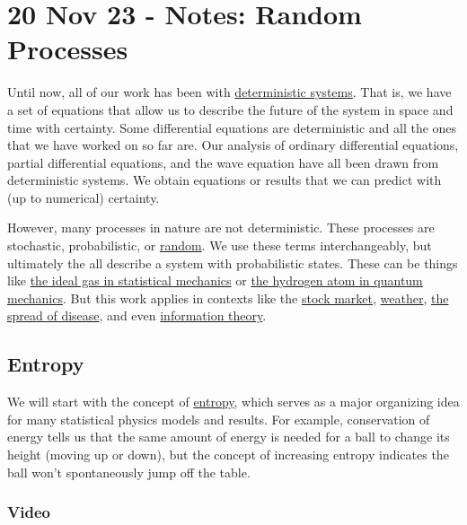 \section{20 Nov 23 - Notes: Random
Processes}\label{nov-23---notes-random-processes}

Until now, all of our work has been with
\href{https://en.wikipedia.org/wiki/Deterministic_system}{deterministic
systems}. That is, we have a set of equations that allow us to describe
the future of the system in space and time with certainty. Some
differential equations are deterministic and all the ones that we have
worked on so far are. Our analysis of ordinary differential equations,
partial differential equations, and the wave equation have all been
drawn from deterministic systems. We obtain equations or results that we
can predict with (up to numerical) certainty.

However, many processes in nature are not deterministic. These processes
are stochastic, probabilistic, or
\href{https://en.wikipedia.org/wiki/Randomness}{random}. We use these
terms interchangeably, but ultimately the all describe a system with
probabilistic states. These can be things like
\href{https://en.wikipedia.org/wiki/Ideal_gas}{the ideal gas in
statistical mechanics} or
\href{https://en.wikipedia.org/wiki/Hydrogen_atom}{the hydrogen atom in
quantum mechanics}. But this work applies in contexts like the
\href{https://bsj.berkeley.edu/how-scientists-are-using-statistical-physics-to-predict-the-stock-market/}{stock
market},
\href{https://en.wikipedia.org/wiki/Numerical_weather_prediction}{weather},
\href{https://journals.aps.org/pre/abstract/10.1103/PhysRevE.104.014132}{the
spread of disease}, and even
\href{https://en.wikipedia.org/wiki/Information_theory}{information
theory}.

\subsection{Entropy}\label{entropy}

We will start with the concept of
\href{https://en.wikipedia.org/wiki/Entropy}{entropy}, which serves as a
major organizing idea for many statistical physics models and results.
For example, conservation of energy tells us that the same amount of
energy is needed for a ball to change its height (moving up or down),
but the concept of increasing entropy indicates the ball won't
spontaneously jump off the table.

\subsubsection{Video}\label{video}

